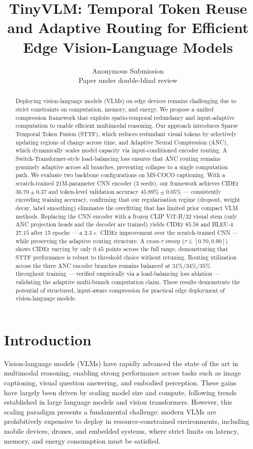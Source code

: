 \documentclass{article}
\title{TinyVLM: Temporal Token Reuse and Adaptive Routing for Efficient Edge Vision-Language Models}
\author{%
  Anonymous Submission \\
  Paper under double-blind review \\
}
\begin{document}
\maketitle


\begin{abstract}
Deploying vision-language models (VLMs) on edge devices remains challenging due to strict constraints on computation, memory, and energy. We propose a unified compression framework that exploits spatio-temporal redundancy and input-adaptive computation to enable efficient multimodal reasoning. Our approach introduces Sparse Temporal Token Fusion (STTF), which reduces redundant visual tokens by selectively updating regions of change across time, and Adaptive Neural Compression (ANC), which dynamically scales model capacity via input-conditioned encoder routing. A Switch-Transformer-style load-balancing loss ensures that ANC routing remains genuinely adaptive across all branches, preventing collapse to a single computation path. We evaluate two backbone configurations on MS-COCO captioning. With a scratch-trained 21M-parameter CNN encoder (3 seeds), our framework achieves CIDEr $36.70 \pm 0.37$ and token-level validation accuracy $45.89\% \pm 0.05\%$ — consistently exceeding training accuracy, confirming that our regularisation regime (dropout, weight decay, label smoothing) eliminates the overfitting that has limited prior compact VLM methods. Replacing the CNN encoder with a frozen CLIP ViT-B/32 visual stem (only ANC projection heads and the decoder are trained) yields CIDEr $85.58$ and BLEU-4 $27.15$ after 15 epochs — a $2.3\times$ CIDEr improvement over the scratch-trained CNN — while preserving the adaptive routing structure. A cross-$\tau$ sweep ($\tau \in [0.70, 0.90]$) shows CIDEr varying by only $0.45$ points across the full range, demonstrating that STTF performance is robust to threshold choice without retuning. Routing utilization across the three ANC encoder branches remains balanced at $31\%$/$34\%$/$35\%$ throughout training — verified empirically via a load-balancing loss ablation — validating the adaptive multi-branch computation claim. These results demonstrate the potential of structured, input-aware compression for practical edge deployment of vision-language models.

\end{abstract}



\section{Introduction}
Vision-language models (VLMs) have rapidly advanced the state of the art in multimodal reasoning, enabling strong performance across tasks such as image captioning, visual question answering, and embodied perception. These gains have largely been driven by scaling model size and compute, following trends established in large language models and vision transformers. However, this scaling paradigm presents a fundamental challenge: modern VLMs are prohibitively expensive to deploy in resource-constrained environments, including mobile devices, drones, and embedded systems, where strict limits on latency, memory, and energy consumption must be satisfied.
\end{document}
